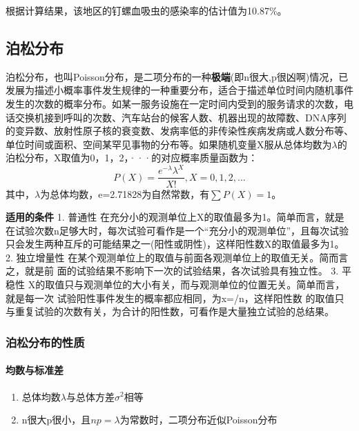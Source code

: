 \documentclass[
]{article}
\providecommand{\tightlist}{%
  \setlength{\itemsep}{0pt}\setlength{\parskip}{0pt}}
\begin{document}
根据计算结果，该地区的钉螺血吸虫的感染率的估计值为10.87\%。

\hypertarget{ux6ccaux677eux5206ux5e03}{%
\subsection{泊松分布}\label{ux6ccaux677eux5206ux5e03}}

泊松分布，也叫Poisson分布，是二项分布的一种\textbf{极端}(即n很大,p很凶啊)情况，已发展为描述小概率事件发生规律的一种重要分布，适合于描述单位时间内随机事件发生的次数的概率分布。如某一服务设施在一定时间内受到的服务请求的次数，电话交换机接到呼叫的次数、汽车站台的候客人数、机器出现的故障数、DNA序列的变异数、放射性原子核的衰变数、发病率低的非传染性疾病发病或人数分布等、单位时间或面积、空间某罕见事物的分布等。如果随机变量X服从总体均数为\(\lambda\)的泊松分布，X取值为0，1，2，···的对应概率质量函数为：
\[P(X)=\frac{e^{-\lambda}\lambda^X}{X!}, X=0,1,2,\dots\]
其中，\(\lambda\)为总体均数，e=2.71828为自然常数，有\(\sum{P(X)}=1\)。

\textbf{适用的条件}
1. 普通性 在充分小的观测单位上X的取值最多为1。简单而言，就是在试验次数n足够大时，每次试验可看作是一个``充分小的观测单位''，且每次试验只会发生两种互斥的可能结果之一(阳性或阴性)，这样阳性数X的取值最多为1。
2. 独立增量性 在某个观测单位上的取值与前面各观测单位上的取值无关。简而言之，就是前 面的试验结果不影响下一次的试验结果，各次试验具有独立性。
3. 平稳性 X的取值只与观测单位的大小有关，而与观测单位的位置无关。简单而言，就是每一次 试验阳性事件发生的概率都应相同，为x=/n，这样阳性数 的取值只与重复试验的次数有关，为合计的阳性数，可看作是大量独立试验的总结果。

\hypertarget{ux6ccaux677eux5206ux5e03ux7684ux6027ux8d28}{%
\subsubsection{泊松分布的性质}\label{ux6ccaux677eux5206ux5e03ux7684ux6027ux8d28}}

\hypertarget{ux5747ux6570ux4e0eux6807ux51c6ux5dee-1}{%
\paragraph{均数与标准差}\label{ux5747ux6570ux4e0eux6807ux51c6ux5dee-1}}

\begin{enumerate}
\def\labelenumi{\arabic{enumi}.}
\tightlist
\item
  总体均数\(\lambda\)与总体方差\(\sigma^2\)相等
\item
  n很大p很小，且\(np=\lambda\)为常数时，二项分布近似Poisson分布
\end{enumerate}
\end{document}
